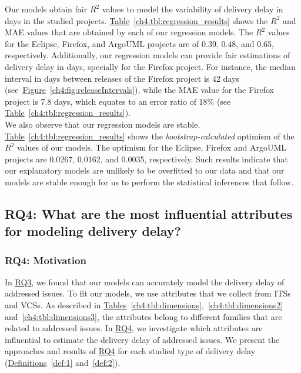 \noindent{} Our models obtain fair $R^2$ values to
model the variability of delivery delay in days in the studied projects.
\hyperref[ch4:tbl:regression_results]{Table}~\ref{ch4:tbl:regression_results} shows the
$R^2$ and MAE values that are obtained by each of our regression models. The
$R^2$ values for the Eclipse, Firefox, and ArgoUML projects are of 0.39, 0.48,
and 0.65, respectively. 
Additionally, our regression models can provide fair
estimations of delivery delay in days, specially for the Firefox project. For
instance, the median interval in days between releases of the Firefox project is
42 days
(see~\hyperref[ch4:fig:releaseIntervals]{Figure}~\ref{ch4:fig:releaseIntervals}), while
the MAE value for the Firefox project is 7.8 days, which equates to an error
ratio of 18\% (see
\hyperref[ch4:tbl:regression_results]{Table}~\ref{ch4:tbl:regression_results}).\\

\noindent{} We also
observe that our regression models are stable.
\hyperref[ch4:tbl:regression_results]{Table}~\ref{ch4:tbl:regression_results} shows the
\textit{bootstrap-calculated} optimism of the $R^2$ values of our models. The
optimism for the Eclipse, Firefox and ArgoUML projects are 0.0267, 0.0162, and 0.0035,
respectively. Such results indicate that our explanatory models are unlikely to
be overfitted to our data and that our models are stable enough for us to perform the
statistical inferences that follow. 


\subsection{RQ4: What are the most influential attributes for
modeling delivery delay?}\label{ch4:rq4}

\subsubsection*{RQ4: Motivation} In \hyperref[ch4:rq3]{RQ3}, we found that our
models can accurately model the delivery delay of addressed issues. To fit our
models, we use attributes that we collect from ITSs and VCSs. As described in
\hyperref[ch4:tbl:dimensions]{Tables}~\ref{ch4:tbl:dimensions},~\ref{ch4:tbl:dimensions2}
and~\ref{ch4:tbl:dimensions3}, the attributes belong to different families that
are related to addressed issues. In \hyperref[ch4:rq4]{RQ4}, we investigate
which attributes are influential to estimate the delivery delay of addressed
issues. We present the approaches and results of \hyperref[ch4:rq4]{RQ4} for
each studied type of delivery delay (\hyperref[def:1]{Definitions}~\ref{def:1}
and~\ref{def:2}). 

